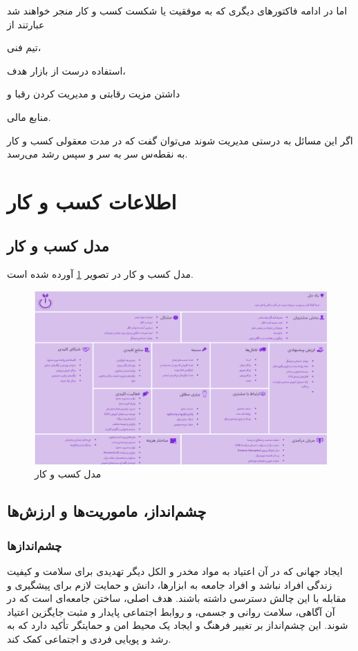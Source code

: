 \documentclass[dvipsnames, svgnames, x11names, 11pt]{article}
\begin{document}
اما در ادامه فاکتور‌های دیگری که به موفقیت یا شکست کسب و کار منجر خواهند شد عبارتند از
\begin{inparaitem}
\item 
تیم فنی،
\item 
استفاده درست از بازار هدف،
\item 
داشتن مزیت رقابتی و مدیریت کردن رقبا و
\item 
منابع مالی.
\end{inparaitem}
اگر این مسائل به درستی مدیریت شوند می‌توان گفت که در مدت معقولی کسب و کار به نقطه‌س سر به سر و سپس رشد می‌رسد.

\section{اطلاعات کسب و کار}

\subsection{مدل کسب و کار}
مدل کسب و کار در تصویر
\ref{fig:canvas}
آورده شده است.

\begin{figure}[b]
\begin{center}
\includegraphics[scale=0.74, angle=90]{../images/canvas1}
\end{center}
\caption{مدل کسب و کار}
\label{fig:canvas}
\end{figure}

\subsection{چشم‌انداز، ماموریت‌ها و ارزش‌ها}
\subsubsection{چشم‌انداز‌ها}
ایجاد جهانی که در آن اعتیاد به مواد مخدر و الکل دیگر تهدیدی برای سلامت و کیفیت زندگی افراد نباشد و افراد جامعه به ابزارها، دانش و حمایت لازم برای پیشگیری و مقابله با این چالش دسترسی داشته باشند. هدف اصلی، ساختن جامعه‌ای است که در آن آگاهی، سلامت روانی و جسمی، و روابط اجتماعی پایدار و مثبت جایگزین اعتیاد شوند. این چشم‌انداز بر تغییر فرهنگ و ایجاد یک محیط امن و حمایتگر تأکید دارد که به رشد و پویایی فردی و اجتماعی کمک کند.
\end{document}
